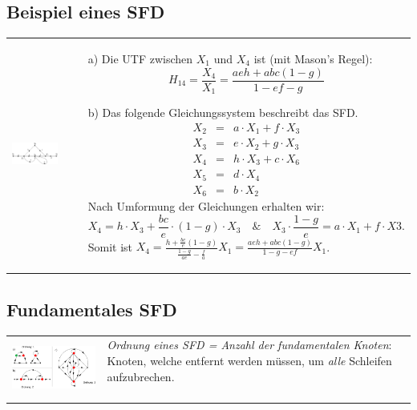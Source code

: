 \subsection{Beispiel eines SFD }
\begin{tabular}{ll}
	\parbox{7cm}{
    	\includegraphics[width=7cm]{./bilder/sfd-bsp.png}
    }
    
    & \parbox{12cm}{
    \begin{enumerate}
		\item[a)] Die UTF zwischen $X_1$ und $X_4$ ist (mit Mason's Regel):\\
		\begin{equation*}
		H_{14}=\frac{X_4}{X_1}=\frac{aeh+abc(1-g)}{1-ef-g}
		\end{equation*}
		\item[b)] Das folgende Gleichungssystem beschreibt das SFD.
		\begin{eqnarray*}
		X_2 &=&a\cdot X_1+f\cdot X_3\\
		X_3 &=&e\cdot X_2+g\cdot X_3\\
		X_4 &=&h\cdot X_3+c\cdot X_6\\
		X_5 &=&d\cdot X_4\\
		X_6 &=&b\cdot X_2
		\end{eqnarray*}
		Nach Umformung der Gleichungen erhalten wir:
		\begin{equation*}
		X_4=h\cdot X_3+\frac{bc}{e}\cdot (1-g)\cdot X_3\quad\&\quad X_3\cdot
		\frac{1-g}{e}=a\cdot X_1+f\cdot X3.
		\end{equation*}
		Somit ist $X_4=\frac{h+\frac{bc}{e}(1-g)}{\frac{1-g}{ae}-\frac{f}{a}}X_1=\frac{aeh+abc(1-g)}{1-g-ef}X_1$.
	\end{enumerate}}
\end{tabular}

\subsection{Fundamentales SFD }
\begin{tabular}{ll}
	\parbox{7cm}{
    	\includegraphics[width=7cm]{./bilder/sfd-ordnung.png}
    }
    
    & \parbox{12cm}{
		\textit{Ordnung eines SFD = Anzahl der fundamentalen Knoten}: Knoten, welche
		entfernt werden müssen, um \textit{alle} Schleifen aufzubrechen. \\ \\
	}
\end{tabular}


